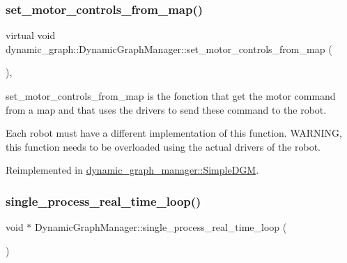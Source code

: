 \subsubsection{\texorpdfstring{set\+\_\+motor\+\_\+controls\+\_\+from\+\_\+map()}{set\_motor\_controls\_from\_map()}}
{\footnotesize\ttfamily virtual void dynamic\+\_\+graph\+::\+Dynamic\+Graph\+Manager\+::set\+\_\+motor\+\_\+controls\+\_\+from\+\_\+map (\begin{DoxyParamCaption}\item[{const \hyperlink{namespacedynamic__graph_abd184187f3bc15df5e227d866529e4a7}{Vector\+D\+G\+Map} \&}]{ }\end{DoxyParamCaption})\hspace{0.3cm}{\ttfamily [inline]}, {\ttfamily [virtual]}}



set\+\_\+motor\+\_\+controls\+\_\+from\+\_\+map is the fonction that get the motor command from a map and that uses the drivers to send these command to the robot. 

Each robot must have a different implementation of this function. W\+A\+R\+N\+I\+NG, this function needs to be overloaded using the actual drivers of the robot. 

Reimplemented in \hyperlink{classdynamic__graph__manager_1_1SimpleDGM_ad38ccd35cc0c409a0aaefa8565634109}{dynamic\+\_\+graph\+\_\+manager\+::\+Simple\+D\+GM}.

\mbox{\label{classdynamic__graph_1_1DynamicGraphManager_adf3adb88c5913b21b51c1f7bfab6d0f3}} 
\subsubsection{\texorpdfstring{single\+\_\+process\+\_\+real\+\_\+time\+\_\+loop()}{single\_process\_real\_time\_loop()}}
{\footnotesize\ttfamily void $\ast$ Dynamic\+Graph\+Manager\+::single\+\_\+process\+\_\+real\+\_\+time\+\_\+loop (\begin{DoxyParamCaption}{ }\end{DoxyParamCaption})\hspace{0.3cm}{\ttfamily [private]}}



